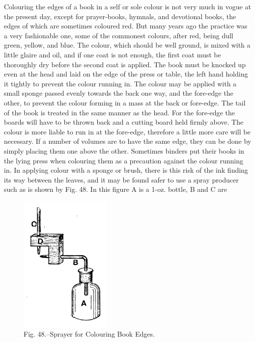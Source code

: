 \documentclass[twoside]{book}
\begin{document}
Colouring the edges of a book in a self or sole
colour is not very much in vogue at the present day,
except for prayer-books, hymnals, and devotional
books, the edges of which are sometimes coloured
red. But many years ago the practice was a very
fashionable one, some of the commonest colours,
after red, being dull green, yellow, and blue.
The colour, which should be well ground, is mixed with
a little glaire and oil, and if one coat is not enough,
the first coat must be thoroughly dry before the
second coat is applied. The book must be knocked
up even at the head and laid on the edge of the
press or table, the left hand holding it tightly to
prevent the colour running in. The colour may be
applied with a small sponge passed evenly towards
the back one way, and the fore-edge the other, to
prevent the colour forming in a mass at the back
or fore-edge. The tail of the book is treated in the
same manner as the head. For the fore-edge the
boards will have to be thrown back and a cutting
board held firmly above. The colour is more liable
to run in at the fore-edge, therefore a little more
\pagebreak
care will be necessary. If a number of volumes are
to have the same edge, they can be done by simply
placing them one above the other. Sometimes
binders put their books in the lying press when
colouring them as a precaution against the colour
running in. In applying colour with a sponge or
brush, there is this risk of the ink finding its way
between the leaves, and it may be found safer to
use a spray producer such as is shown by Fig. 48.
In this figure A is a 1-oz. bottle, B and C are
	\begin{figure}[h]
		\centering
		\includegraphics[width=0.4\textwidth]{Figures/_048.png}
		\caption*{Fig. 48.--Sprayer for Colouring Book Edges.}
	\end{figure}
\end{document}
